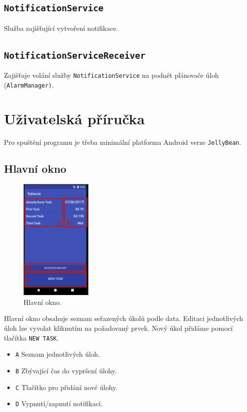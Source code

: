 \documentclass[12pt]{article}
\begin{document}
\subsection{\texttt{NotificationService}}
Služba zajišťující vytvoření notifikace.

\subsection{\texttt{NotificationServiceReceiver}}
Zajišťuje volání služby \texttt{NotificationService} na podnět plánovače úloh (\texttt{AlarmManager)}.


\pagebreak
\section{Uživatelská příručka}
Pro spuštění programu je třeba minimální platforma Android verze \texttt{JellyBean}. 

\subsection{Hlavní okno}
\begin{figure}
\centering
\vspace{-1.5cm}
\includegraphics[height=6cm]{MainWindow.png}
\caption{Hlavní okno.}
\label{MainWindow}
\end{figure}


Hlavní okno obsahuje seznam seřazených úkolů podle data. Editaci jednotlivých úloh lze vyvolat kliknutím na požadovaný prvek. Nový úkol přidáme pomocí tlačítka \texttt{NEW TASK}.

\begin{itemize}
\renewcommand\labelitemi{--}
\setlength\itemsep{1px}
\item{\texttt{A}} Seznam jednotlivých úloh.
\item{\texttt{B}} Zbývající čas do vypršení úlohy.
\item{\texttt{C}} Tlačítko pro přidání nové úlohy.
\item{\texttt{D}} Vypnutí/zapnutí notifikací.
\end{itemize}
\end{document}
